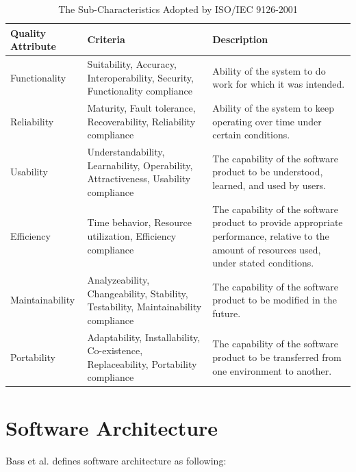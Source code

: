 {\begin{table}[ht!]
	\centering
	\begin{tabular}{ | l | p{4cm} | p{6cm} |}
	\hline
	\textbf{Quality Attribute} & \textbf{Criteria} & \textbf{Description} \\ \hline
	Functionality 		&	Suitability, Accuracy, Interoperability, Security, Functionality compliance 	&	Ability of the system to do work for which it was intended. \\ \hline
	Reliability 		&	Maturity, Fault tolerance, Recoverability, Reliability compliance	&	Ability of the system to keep operating over time under certain conditions. \\ \hline
	Usability 			&	Understandability, Learnability, Operability, Attractiveness, Usability compliance 	 &	The capability of the software product to be understood, learned, and used by users. \\ \hline
	Efficiency 			&	Time behavior, Resource utilization, Efficiency compliance	 &	The capability of the software product to provide appropriate performance, relative to the amount of resources used, under stated conditions. \\ \hline
	Maintainability 	&	Analyzeability, Changeability, Stability, Testability, Maintainability compliance	 &	The capability of the software product to be modified in the future.\\ \hline
	Portability 		&	Adaptability, Installability, Co-existence, Replaceability, Portability compliance 	 &	The capability of the software product to be transferred from one environment to another. \\ \hline
	\end{tabular}
	\caption{The Sub-Characteristics Adopted by ISO/IEC 9126-2001} \label{tab:qattribute}
\end{table}







\section{Software Architecture}
\label{sec:2-SA}
Bass et al.\cite{Bass:2012:SAP:2392670} defines software architecture as following: 

}
